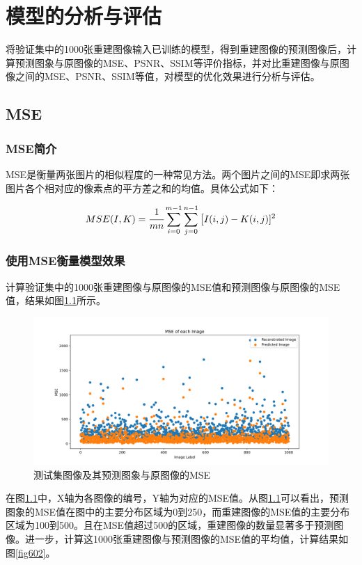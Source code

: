 \chapter{模型的分析与评估}
\label{cha:experiment}

将验证集中的1000张重建图像输入已训练的模型，得到重建图像的预测图像后，计算预测图象与原图像的MSE、PSNR、SSIM等评价指标，并对比重建图像与原图像之间的MSE、PSNR、SSIM等值，对模型的优化效果进行分析与评估。

\section{MSE}

\subsection{MSE简介}
MSE是衡量两张图片的相似程度的一种常见方法。两个图片之间的MSE即求两张图片各个相对应的像素点的平方差之和的均值。具体公式如下：

\begin{equation} \label{601}
	MSE(I,K)=\cfrac{1}{mn}\sum_{i=0}^{m-1}\sum_{j=0}^{n-1}\big [I(i,j)-K(i,j)]^2
\end{equation}

\subsection{使用MSE衡量模型效果}
计算验证集中的1000张重建图像与原图像的MSE值和预测图像与原图像的MSE值，结果如图\ref{fig601}所示。
 
\begin{figure}[h]
	\centering
	\includegraphics[width=0.9\columnwidth]{image/chap06/img601.png}
	\caption{测试集图像及其预测图象与原图像的MSE}
	\label{fig601}
\end{figure}

在图\ref{fig601}中，X轴为各图像的编号，Y轴为对应的MSE值。从图\ref{fig601}可以看出，预测图象的MSE值在图中的主要分布区域为0到250，而重建图像的MSE值的主要分布区域为100到500。且在MSE值超过500的区域，重建图像的数量显著多于预测图像。进一步，计算这1000张重建图像与预测图像的MSE值的平均值，计算结果如图\ref{fig602}。

